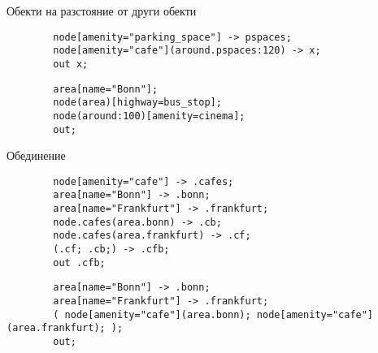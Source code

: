 \documentclass[10pt]{beamer}
\begin{document}
  \begin{frame}[fragile]{Обекти на разстояние от други обекти}
    \begin{lstwrap}\begin{lstlisting}
        node[amenity="parking_space"] -> pspaces;
        node[amenity="cafe"](around.pspaces:120) -> x;
        out x;
    \end{lstlisting}\end{lstwrap}
    \begin{lstwrap}\begin{lstlisting}
        area[name="Bonn"];
        node(area)[highway=bus_stop];
        node(around:100)[amenity=cinema];
        out;
    \end{lstlisting}\end{lstwrap}
  \end{frame}

  \begin{frame}[fragile]{Обединение}
    \begin{lstwrap}\begin{lstlisting}
        node[amenity="cafe"] -> .cafes;
        area[name="Bonn"] -> .bonn;
        area[name="Frankfurt"] -> .frankfurt;
        node.cafes(area.bonn) -> .cb;
        node.cafes(area.frankfurt) -> .cf;
        (.cf; .cb;) -> .cfb;
        out .cfb;
    \end{lstlisting}\end{lstwrap}

    \begin{lstwrap}\begin{lstlisting}
        area[name="Bonn"] -> .bonn;
        area[name="Frankfurt"] -> .frankfurt;
        ( node[amenity="cafe"](area.bonn); node[amenity="cafe"](area.frankfurt); );
        out;
    \end{lstlisting}\end{lstwrap}
  \end{frame}
\end{document}
